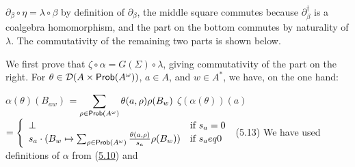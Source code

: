 \documentclass[11pt,a4paper]{amsart}
\begin{document}
\hypertarget{html:S5.SS0.SSS0.Px2.SPx1.p3.m5}{}\({\partial_{\beta}\circ\eta=\lambda\circ\beta}\) by definition of %
\hypertarget{html:S5.SS0.SSS0.Px2.SPx1.p3.m6}{}\({\partial_{\beta}}\), the middle square commutes because %
\hypertarget{html:S5.SS0.SSS0.Px2.SPx1.p3.m7}{}\({\partial_{\beta}^{\dagger}}\) is a coalgebra homomorphism, and the part on the bottom commutes by naturality of %
\hypertarget{html:S5.SS0.SSS0.Px2.SPx1.p3.m8}{}\({\lambda}\). The commutativity of the remaining two parts is shown below.
\par\medskip
\hypertarget{html:S5.SS0.SSS0.Px2.SPx1.p4}{} We first prove that %
\hypertarget{html:S5.SS0.SSS0.Px2.SPx1.p4.m1}{}\({\zeta\circ\alpha=G(\Sigma)\circ\lambda}\), giving commutativity of the part on the right. For %
\hypertarget{html:S5.SS0.SSS0.Px2.SPx1.p4.m2}{}\({\theta\in{\mathcal{D}}(A\times\text{\sf Prob}(A^{\omega}))}\), %
\hypertarget{html:S5.SS0.SSS0.Px2.SPx1.p4.m3}{}\({a\in A}\), and %
\hypertarget{html:S5.SS0.SSS0.Px2.SPx1.p4.m4}{}\({w\in A^{*}}\), we have, on the one hand:
\par\medskip
\hypertarget{html:S8.EGx8}{} %
\hypertarget{html:S5.Ex7}{}  %
\hypertarget{html:S5.Ex7.m1}{}\({\displaystyle\alpha(\theta)(B_{aw})}\) %
\hypertarget{html:S5.Ex7.m2}{}\({\displaystyle=\sum_{\rho\in\text{\sf Prob}(A^{\omega})}\theta(a,\rho)\rho(B_{w})}\)   %
\hypertarget{html:S5.E13}{}  %
\hypertarget{html:S5.E13.m1}{}\({\displaystyle\zeta(\alpha(\theta))(a)}\) %
\hypertarget{html:S5.E13.m2}{}\({\displaystyle=\left\{\begin{array}[]{ll}\bot&\mbox{if $s_{a}=0$}\\
s_{a}\cdot(B_{w}\mapsto\sum_{\rho\in\text{\sf Prob}(A^{\omega})}\frac{\theta(a,\rho)}{s_{a}}\rho(B_{w}))&\mbox{if $s_{a}
eq 0$}\end{array}\right.}\)  (5.13)   We have used definitions of %
\hypertarget{html:S5.SS0.SSS0.Px2.SPx1.p4.m5}{}\({\alpha}\) from (\hyperlink{html:S5.E10}{5.10}) and %
\end{document}
